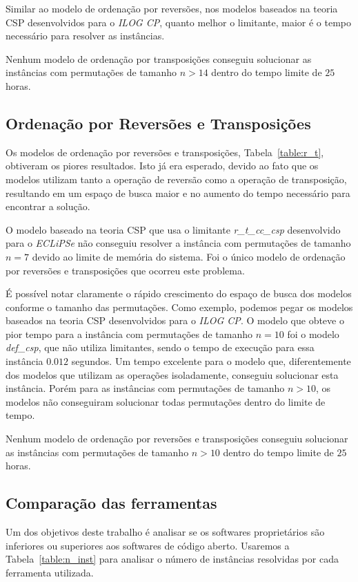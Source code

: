 Similar ao modelo de ordenação por reversões, nos modelos baseados na
teoria CSP desenvolvidos para o \textit{ILOG CP}, quanto melhor o
limitante, maior é o tempo necessário para resolver as instâncias.

Nenhum modelo de ordenação por transposições conseguiu solucionar as
instâncias com permutações de tamanho $n > 14$ dentro do tempo limite de
$25$ horas.



\subsection{Ordenação por Reversões e Transposições}
\label{subsec:analise_r_t}
Os modelos de ordenação por reversões e transposições,
Tabela~\ref{table:r_t}, obtiveram os piores resultados. Isto já era
esperado, devido ao fato que os modelos utilizam tanto a operação de
reversão como a operação de transposição, resultando em um espaço de
busca maior e no aumento do tempo necessário para encontrar a solução.

O modelo baseado na teoria CSP que usa o limitante
\textit{r\_t\_cc\_csp} desenvolvido para o \textit{ECLiPSe} não
conseguiu resolver a instância com permutações de tamanho $n = 7$ devido
ao limite de memória do sistema. Foi o único modelo de ordenação por
reversões e transposições que ocorreu este problema.

É possível notar claramente o rápido crescimento do espaço de busca dos
modelos conforme o tamanho das permutações. Como exemplo, podemos pegar
os modelos baseados na teoria CSP desenvolvidos para o \textit{ILOG CP}.
O modelo que obteve o pior tempo para a instância com permutações de
tamanho $n = 10$ foi o modelo \textit{def\_csp}, que não utiliza
limitantes, sendo o tempo de execução para essa instância $0.012$
segundos. Um tempo excelente para o modelo que, diferentemente dos
modelos que utilizam as operações isoladamente, conseguiu solucionar
esta instância. Porém para as instâncias com permutações de tamanho $n >
10$, os modelos não conseguiram solucionar todas permutações dentro do
limite de tempo.

Nenhum modelo de ordenação por reversões e transposições conseguiu
solucionar as instâncias com permutações de tamanho $n > 10$ dentro do
tempo limite de $25$ horas.



\subsection{Comparação das ferramentas}
\label{subsec:analise_ferramentas}
Um dos objetivos deste trabalho é analisar se os softwares proprietários
são inferiores ou superiores aos softwares de código aberto. Usaremos a
Tabela~\ref{table:n_inst} para analisar o número de instâncias
resolvidas por cada ferramenta utilizada.

